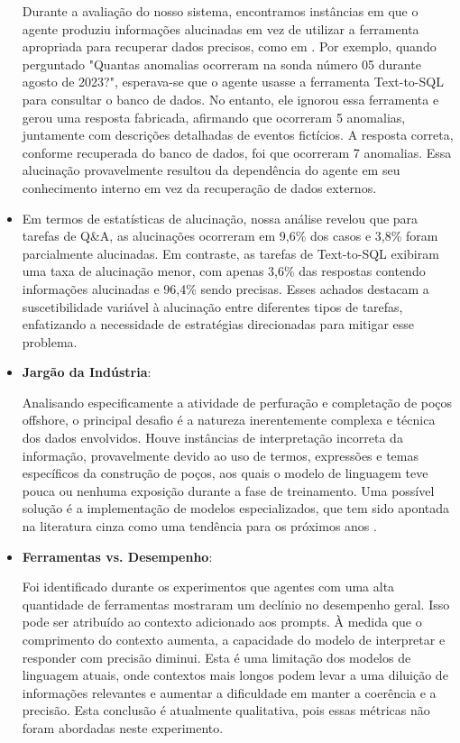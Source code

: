 \begin{itemize}
                    Durante a avaliação do nosso sistema, encontramos instâncias em que o agente produziu informações alucinadas em vez de utilizar a ferramenta apropriada para recuperar dados precisos, como em \cite{Bilbao2023}. Por exemplo, quando perguntado "Quantas anomalias ocorreram na sonda número 05 durante agosto de 2023?", esperava-se que o agente usasse a ferramenta Text-to-SQL para consultar o banco de dados. No entanto, ele ignorou essa ferramenta e gerou uma resposta fabricada, afirmando que ocorreram 5 anomalias, juntamente com descrições detalhadas de eventos fictícios. A resposta correta, conforme recuperada do banco de dados, foi que ocorreram 7 anomalias. Essa alucinação provavelmente resultou da dependência do agente em seu conhecimento interno em vez da recuperação de dados externos.
                    \item Em termos de estatísticas de alucinação, nossa análise revelou que para tarefas de Q\&A, as alucinações ocorreram em 9,6\% dos casos e 3,8\% foram parcialmente alucinadas. Em contraste, as tarefas de Text-to-SQL exibiram uma taxa de alucinação menor, com apenas 3,6\% das respostas contendo informações alucinadas e 96,4\% sendo precisas. Esses achados destacam a suscetibilidade variável à alucinação entre diferentes tipos de tarefas, enfatizando a necessidade de estratégias direcionadas para mitigar esse problema.
                
            
                \item \textbf{Jargão da Indústria}:
                
                    Analisando especificamente a atividade de perfuração e completação de poços offshore, o principal desafio é a natureza inerentemente complexa e técnica dos dados envolvidos. 
                    Houve instâncias de interpretação incorreta da informação, provavelmente devido ao uso de termos, expressões e temas específicos da construção de poços, aos quais o modelo de linguagem teve pouca ou nenhuma exposição durante a fase de treinamento. 
                    Uma possível solução é a implementação de modelos especializados, que tem sido apontada na literatura cinza como uma tendência para os próximos anos \cite{Shah2024, Meena2023, Ghosh2023}.
                
            
                \item \textbf{Ferramentas vs. Desempenho}: 
                
                    Foi identificado durante os experimentos que agentes com uma alta quantidade de ferramentas mostraram um declínio no desempenho geral. Isso pode ser atribuído ao contexto adicionado aos prompts. À medida que o comprimento do contexto aumenta, a capacidade do modelo de interpretar e responder com precisão diminui. Esta é uma limitação dos modelos de linguagem atuais, onde contextos mais longos podem levar a uma diluição de informações relevantes e aumentar a dificuldade em manter a coerência e a precisão. Esta conclusão é atualmente qualitativa, pois essas métricas não foram abordadas neste experimento.
                

\end{itemize}
